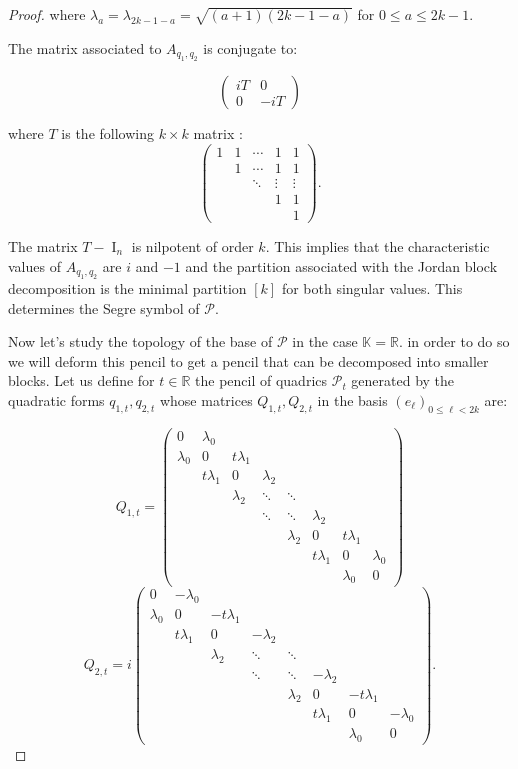 \documentclass[reqno,10pt]{amsart}
\theoremstyle{plain}
\theoremstyle{definition}
\theoremstyle{remark}
\newcommand{\R}{\mathbb{R}}
\newcommand{\K}{\mathbb{K}}
\DeclareMathOperator{\I}{I}
\begin{document}
\begin{proof}
 where $\lambda_a=\lambda_{2k-1-a}=\sqrt{(a+1)(2k-1-a)}$ for $0\leq a\leq 2k-1$.

\smallskip

The matrix associated to $A_{q_1,q_2}$ is conjugate to:

$$\begin{pmatrix}
iT& 0 \\
0 & -iT \end{pmatrix}
$$
 
 where $T$ is the following $k\times k$ matrix :
 $$\begin{pmatrix}
1& 1 &  \cdots &1 &1 \\
 & 1 & \cdots &1 & 1 \\
&  &\ddots & \vdots & \vdots \\
 &   &  &1 &1 \\
 &   &  & &1 \end{pmatrix}.$$
 
The matrix $T-\I_n$ is nilpotent of order $k$. This implies that the characteristic values of $A_{q_1,q_2}$ are $i$ and $-1$ and the partition associated with the Jordan block decomposition is the minimal partition $[k]$ for both singular values. This determines the Segre symbol of $\mathcal{P}$.

\medskip

Now let's study the topology of the base of $\mathcal{P}$ in the case $\K=\R$. in order to do so we will deform this pencil to get a pencil that can be decomposed into smaller blocks. Let us define for $t\in \mathbb{R}$ the pencil of quadrics $\mathcal{P}_t$ generated by the quadratic forms $q_{1,t},q_{2,t}$ whose matrices $Q_{1,t},Q_{2,t}$ in the basis $(e_\ell)_{0\leq \ell<2k}$ are:

$$Q_{1,t}=\begin{pmatrix}
0& \lambda_0 & & & && \\
\lambda_0 & 0 & t\lambda_1& & &&  \\
& t\lambda_1 & 0&\lambda_2 & &&  \\
 &    &\lambda_2&\ddots &\ddots  && \\
  &    &&\ddots&\ddots &\lambda_2  & \\
 &  & && \lambda_2& 0& t\lambda_1 \\
 &  & && & t\lambda_1& 0& \lambda_0\\
 &  & && & &\lambda_0&  0\end{pmatrix}$$$$Q_{2,t}=i\begin{pmatrix}
0& -\lambda_0 & & & && \\
\lambda_0 & 0 & -t\lambda_1& & &&  \\
& t\lambda_1 & 0&-\lambda_2 & &&  \\
 &    &\lambda_2&\ddots &\ddots  && \\
  &    &&\ddots&\ddots &-\lambda_2  & \\
 &  & && \lambda_2& 0& -t\lambda_1 \\
 &  & && & t\lambda_1& 0& -\lambda_0\\
 &  & && & &\lambda_0&  0\end{pmatrix}.$$
 

\end{proof}
\end{document}
